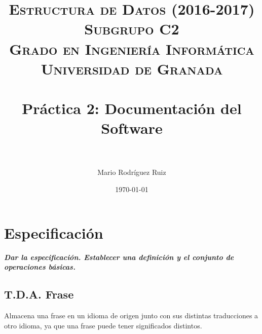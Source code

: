 


\title{	
\normalfont \normalsize 
\textsc{\textbf{Estructura de Datos (2016-2017)} \\ Subgrupo C2 \\ Grado en Ingeniería Informática\\ Universidad de Granada} \\ [25pt] %
\horrule{0.5pt} \\[0.4cm] %
\huge Práctica 2: Documentación del Software \\ %
\horrule{2pt} \\[0.5cm] %
}

\author{Mario Rodríguez Ruiz} %

\date{\normalsize\today} %




\maketitle %

\newpage %

\tableofcontents %

\newpage


\section{Especificación}
\textbf{\textit{Dar la especificación. Establecer una definición y el conjunto de operaciones básicas.}}

\subsection{T.D.A. Frase}
Almacena una frase en un idioma de origen junto con sus distintas traducciones a otro idioma, 
ya que una frase puede tener significados distintos.
\\

